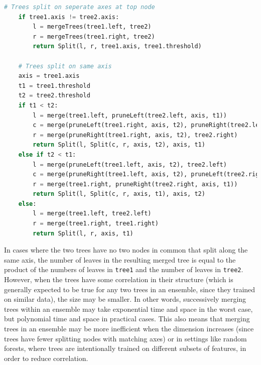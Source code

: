 \documentclass[pageno]{jpaper}
\begin{document}
\begin{doublespacing}
{\begin{lstlisting}[language=Python, caption=merge algorithm]
	# Trees split on seperate axes at top node
	if tree1.axis != tree2.axis:
		l = mergeTrees(tree1.left, tree2)
		r = mergeTrees(tree1.right, tree2)
		return Split(l, r, tree1.axis, tree1.threshold)
	
	# Trees split on same axis
	axis = tree1.axis
	t1 = tree1.threshold
	t2 = tree2.threshold
	if t1 < t2:
		l = merge(tree1.left, pruneLeft(tree2.left, axis, t1))
		c = merge(pruneLeft(tree1.right, axis, t2), pruneRight(tree2.left, axis, t1))
		r = merge(pruneRight(tree1.right, axis, t2), tree2.right)
		return Split(l, Split(c, r, axis, t2), axis, t1)
	else if t2 < t1:
		l = merge(pruneLeft(tree1.left, axis, t2), tree2.left)
		c = merge(pruneRight(tree1.left, axis, t2), pruneLeft(tree2.right, axis, t1))
		r = merge(tree1.right, pruneRight(tree2.right, axis, t1))
		return Split(l, Split(c, r, axis, t1), axis, t2)
	else:
		l = merge(tree1.left, tree2.left)
		r = merge(tree1.right, tree1.right)
		return Split(l, r, axis, t1)
\end{lstlisting}
}

In cases where the two trees have no two nodes in common that split along the same axis, the number of leaves in the resulting merged tree is equal to the product of the numbers of leaves in \verb|tree1| and the number of leaves in \verb|tree2|. However, when the trees have some correlation in their structure (which is generally expected to be true for any two trees in an ensemble, since they trained on similar data), the size may be smaller. In other words, successively merging trees within an ensemble may take exponential time and space in the worst case, but polynomial time and space in practical cases. This also means that merging trees in an ensemble may be more inefficient when the dimension increases (since trees have fewer splitting nodes with matching axes) or in settings like random forests, where trees are intentionally trained on different subsets of features, in order to reduce correlation.


\end{doublespacing}
\end{document}
